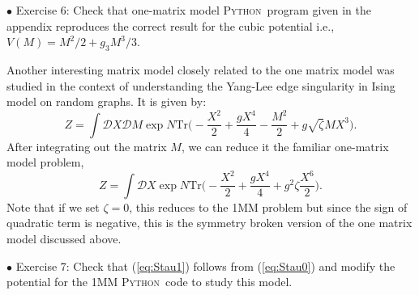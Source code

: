 \documentclass[11pt]{article}
\newcommand{\PY}{\textsc{Python}}
\begin{document}
\begin{mdframed}[backgroundcolor=blue!3] 
	\textsc{} 
	$\bullet$ Exercise 6:  Check that one-matrix model \PY~program given in the appendix reproduces the correct result for the cubic potential 
	i.e., $V(M) = M^2/2 + g_{3}M^3/3$.  
	\label{ex:6} 
\end{mdframed} 
Another interesting matrix model closely related to the one matrix model was 
studied in the context of understanding the Yang-Lee edge singularity
\cite{Staudacher:1989fy} in Ising model on random graphs. 
It is given by: 
\begin{equation}
	\label{eq:Stau0}
	Z = \int \mathcal{D}X \mathcal{D}M \exp N \mbox{Tr}\Bigg(-\frac{X^2}{2} + \frac{gX^4}{4} - \frac{M^2}{2} + g \sqrt{\zeta} MX^3 \Bigg).
\end{equation}
After integrating out the matrix $M$, we can reduce it the familiar one-matrix model problem, 
\begin{equation}
	\label{eq:Stau1} 
	Z = \int \mathcal{D}X \exp N \mbox{Tr}\Bigg(-\frac{X^2}{2} + \frac{gX^4}{4} + g^2 \zeta  \frac{X^6}{2}   \Bigg).
\end{equation}
Note that if we set $\zeta=0$, this reduces to the 1MM problem but since the sign of 
quadratic term is negative, this is the symmetry broken version of the one matrix model 
discussed above. 
\begin{mdframed}[backgroundcolor=blue!3]  
	$\bullet$ Exercise 7: Check that (\ref{eq:Stau1}) follows from (\ref{eq:Stau0}) and modify the potential for the 1MM \PY~code to study this model. 
\end{mdframed} 
\end{document}
